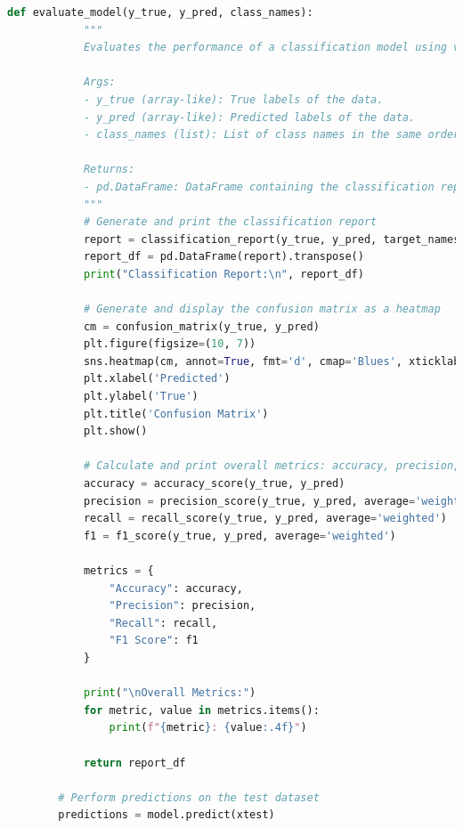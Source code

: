 \documentclass{solutionclass} %
\begin{document}
\begin{solution}
    \begin{lstlisting}[language=Python, basicstyle=\ttfamily\footnotesize, keywordstyle=\color{blue}, commentstyle=\color{gray}]
        def evaluate_model(y_true, y_pred, class_names):
            """
            Evaluates the performance of a classification model using various metrics and visualizations.
        
            Args:
            - y_true (array-like): True labels of the data.
            - y_pred (array-like): Predicted labels of the data.
            - class_names (list): List of class names in the same order as the confusion matrix.
        
            Returns:
            - pd.DataFrame: DataFrame containing the classification report.
            """
            # Generate and print the classification report
            report = classification_report(y_true, y_pred, target_names=class_names, output_dict=True)
            report_df = pd.DataFrame(report).transpose()
            print("Classification Report:\n", report_df)
        
            # Generate and display the confusion matrix as a heatmap
            cm = confusion_matrix(y_true, y_pred)
            plt.figure(figsize=(10, 7))
            sns.heatmap(cm, annot=True, fmt='d', cmap='Blues', xticklabels=class_names, yticklabels=class_names)
            plt.xlabel('Predicted')
            plt.ylabel('True')
            plt.title('Confusion Matrix')
            plt.show()
        
            # Calculate and print overall metrics: accuracy, precision, recall, and F1 score
            accuracy = accuracy_score(y_true, y_pred)
            precision = precision_score(y_true, y_pred, average='weighted')
            recall = recall_score(y_true, y_pred, average='weighted')
            f1 = f1_score(y_true, y_pred, average='weighted')
        
            metrics = {
                "Accuracy": accuracy,
                "Precision": precision,
                "Recall": recall,
                "F1 Score": f1
            }
        
            print("\nOverall Metrics:")
            for metric, value in metrics.items():
                print(f"{metric}: {value:.4f}")
            
            return report_df
        
        # Perform predictions on the test dataset
        predictions = model.predict(xtest)
        

\end{lstlisting}
\end{solution}
\end{document}

